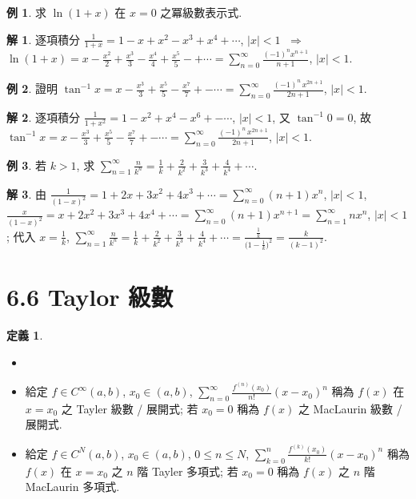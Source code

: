 \documentclass[12pt]{extarticle}
\newcommand{\ds}{\displaystyle}
\newcommand{\ie}{\;\Longrightarrow\;}
\theoremstyle{definition}
\newtheorem*{dfn}{定義}
\newtheorem*{ex}{例}
\newtheorem*{sol}{解}
\begin{document}
\begin{ex}
  求 $\ds\ln(1 + x)$ 在 $x = 0$ 之冪級數表示式. 
\end{ex}

\begin{sol}
  逐項積分 $\ds\frac{1}{1 + x} = 1 - x + x^2 - x^3 + x^4 + \cdots$, $|x| < 1$ $\ie$ $\ds\ln(1 + x) = x - \frac{x^2}{2} + \frac{x^3}{3} - \frac{x^4}{4} + \frac{x^5}{5} -+ \cdots = \sum_{n = 0}^\infty\frac{(-1)^n x^{n + 1}}{n + 1}$, $|x| < 1$. 
\end{sol}

\begin{ex}
  證明 $\ds\tan^{-1}x = x - \frac{x^3}{3} + \frac{x^5}{5} - \frac{x^7}{7} +- \cdots = \sum_{n = 0}^\infty\frac{(-1)^n\,x^{2n + 1}}{2 n + 1}$, $|x| < 1$. 
\end{ex}

\begin{sol}
  逐項積分 $\ds\frac{1}{1 + x^2} = 1 - x^2 + x^4 - x^6 +- \cdots$, $|x| < 1$, 又 $\tan^{-1} 0 = 0$, 故 $\ds\tan^{-1}x = x - \frac{x^3}{3} + \frac{x^5}{5} - \frac{x^7}{7} +- \cdots = \sum_{n = 0}^\infty\frac{(-1)^n\,x^{2n + 1}}{2 n + 1}$, $|x| < 1$. 
\end{sol}

\begin{ex}
  若 $k > 1$, 求 $\ds\sum_{n = 1}^\infty\frac{n}{k^n} = \frac{1}{k} + \frac{2}{k^2} + \frac{3}{k^3} + \frac{4}{k^4} + \cdots$. 
\end{ex}

\begin{sol}
  由 $\ds\frac{1}{(1 - x)^2} = 1 + 2x + 3x^2 + 4x^3 + \cdots = \sum_{n = 0}^\infty(n + 1) x^n$, $|x| < 1$, $\ds\frac{x}{(1 - x)^2} = x + 2x^2 + 3x^3 + 4x^4 + \cdots = \sum_{n = 0}^\infty(n + 1) x^{n + 1} = \sum_{n = 1}^\infty n x^{n}$, $|x| < 1$; 代入 $\ds x = \frac{1}{k}$, $\ds\sum_{n = 1}^\infty\frac{n}{k^n} = \frac{1}{k} + \frac{2}{k^2} + \frac{3}{k^3} + \frac{4}{k^4} + \cdots = \frac{\frac{1}{k}}{\big(1 - \frac{1}{k}\big)^2} = \frac{k}{(k - 1)^2}$. 
\end{sol}

\section*{6.6 Taylor 級數}

\begin{dfn}
  \begin{itemize}\setlength{\itemsep}{0pt}
    \item[]
    \item 給定 $f\in C^\infty(a, b)$, $x_0\in(a, b)$, $\ds\sum_{n = 0}^\infty\frac{f^{(n)}(x_0)}{n!}(x - x_0)^n$ 稱為 $f(x)$ 在 $x = x_0$ 之 Tayler 級數 / 展開式; 若 $x_0 = 0$ 稱為 $f(x)$ 之 MacLaurin 級數 / 展開式. 
    \item 給定 $f\in C^N(a, b)$, $x_0\in(a, b)$, $0\leqslant n\leqslant N$, $\ds\sum_{k = 0}^n\frac{f^{(k)}(x_0)}{k!}(x - x_0)^n$ 稱為 $f(x)$ 在 $x = x_0$ 之 $n$ 階 Tayler 多項式; 若 $x_0 = 0$ 稱為 $f(x)$ 之 $n$ 階 MacLaurin 多項式. 
  \end{itemize}
\end{dfn}
\end{document}
